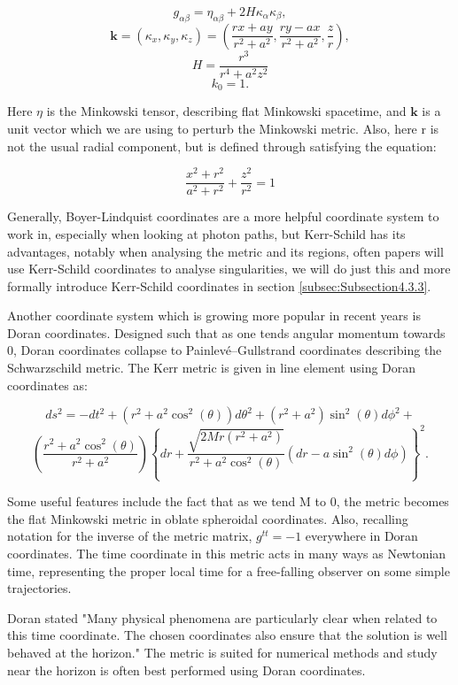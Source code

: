 \documentclass[oneside,openright,frontopenright, singlespacing]{dmathesis}
\begin{document}
	\[g_{\alpha\beta} = \eta_{\alpha\beta} + 2H\kappa_{\alpha}\kappa_{\beta},\]
	\[\textbf{k} = (\kappa_x,\kappa_y,\kappa_z) = \left(\frac{rx+ay}{r^2+a^2},\frac{ry-ax}{r^2+a^2},\frac{z}{r}\right),\]
	\[H = \frac{r^{3}}{r^{4}+a^{2}z^{2}}\]
	\[k_0 = 1.\]

\vspace{1em}
	Here $\eta$ is the Minkowski tensor, describing flat Minkowski spacetime, and $\textbf{k}$ is a unit vector which we are using to perturb the Minkowski metric. Also, here r is not the usual radial component, but is defined through satisfying the equation:

\vspace{1em}
	\[\frac{x^2+r^2}{a^2+r^2}+\frac{z^2}{r^2} = 1\]

\vspace{1em}
	Generally, Boyer-Lindquist coordinates are a more helpful coordinate system to work in, especially when looking at photon paths, but Kerr-Schild has its advantages, notably when analysing the metric and its regions, often papers will use Kerr-Schild coordinates to analyse singularities, we will do just this and more formally introduce Kerr-Schild coordinates in section \ref{subsec:Subsection4.3.3}.

\vspace{1em}
	Another coordinate system which is growing more popular in recent years is Doran coordinates\cite{doran2000new}. Designed such that as one tends angular momentum towards 0, Doran coordinates collapse to Painlev\'e–Gullstrand coordinates\cite{painleve1921mecanique} describing the Schwarzschild metric. The Kerr metric is given in line element using Doran coordinates as:

	\[ds^2=-dt^2+(r^2+a^2\cos^2(\theta))d\theta^2+(r^2+a^2)\sin^2(\theta)d\phi^2+\]
	\[\left(\frac{r^2+a^2\cos^2(\theta)}{r^2+a^2}\right)\left\{dr+\frac{\sqrt{2Mr(r^2+a^2)}}{r^2+a^2\cos^2(\theta)}(dr-a\sin^2(\theta)d\phi)\right\}^2.\]

\vspace{1em}
	Some useful features include the fact that as we tend M to 0, the metric becomes the flat Minkowski metric in oblate spheroidal coordinates. Also, recalling notation for the inverse of the metric matrix, $g^{tt}=-1$ everywhere in Doran coordinates. The time coordinate in this metric acts in many ways as Newtonian time, representing the proper local time for a free-falling observer on some simple trajectories. 

\vspace{1em}
	Doran stated "Many physical phenomena are particularly clear when related to this time coordinate. The chosen coordinates also ensure that the solution is well behaved at the horizon."\cite{doran2000new} The metric is suited for numerical methods and study near the horizon is often best performed using Doran coordinates.
\end{document}
